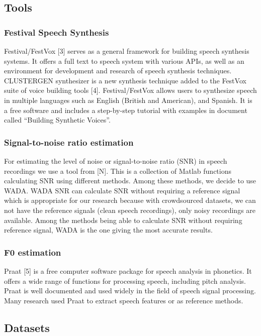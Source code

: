 \documentclass[12pt]{article}
\begin{document}
\subsection{Tools}

\subsubsection{Festival Speech Synthesis}
Festival/FestVox [3] serves as a general framework for building speech synthesis systems. It offers a full text to speech system with various APIs, as well as an environment for development and research of speech synthesis techniques. CLUSTERGEN synthesizer is a new synthesis technique added to the FestVox suite of voice building tools [4]. Festival/FestVox allows users to synthesize speech in multiple languages such as English (British and American), and Spanish. It is a free software and includes a step-by-step tutorial with examples in document called “Building Synthetic Voices”.

\subsubsection{Signal-to-noise ratio estimation}
For estimating the level of noise or signal-to-noise ratio (SNR) in speech recordings we use a tool from [N]. This is a collection of Matlab functions calculating SNR using different methods. Among these methods, we decide to use WADA. WADA SNR can calculate SNR without requiring a reference signal which is appropriate for our research because with crowdsourced datasets, we can not have the reference signals (clean speech recordings), only noisy recordings are available. Among the methods being able to calculate SNR without requiring reference signal, WADA is the one giving the most accurate results.

\subsubsection{F0 estimation}
Praat [5] is a free computer software package for speech analysis in phonetics. It offers a wide range of functions for processing speech, including pitch analysis. Praat is well documented and used widely in the field of speech signal processing. Many research used Praat to extract speech features or as reference methods.

\subsection{Datasets}
\end{document}
